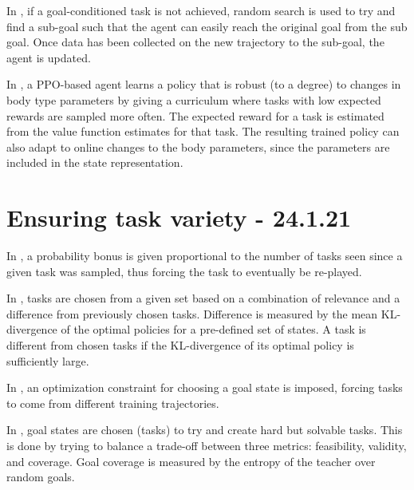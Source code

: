 \documentclass[letterpaper]{article}
\theoremstyle{definition}
\begin{document}
In \cite{Li}, if a goal-conditioned task is not achieved, random search is used to try and find a sub-goal such that the agent can easily reach the original goal from the sub goal. Once data has been collected on the new trajectory to the sub-goal, the agent is updated.

In \cite{Won2019}, a PPO-based agent learns a policy that is robust (to a degree) to changes in body type parameters by giving a curriculum where tasks with low expected rewards are sampled more often. 
The expected reward for a task is estimated from the value function estimates for that task. The resulting trained policy can also adapt to online changes to the body parameters, since the parameters are included in the state representation.

\section{Ensuring task variety - 24.1.21} \label{sec:variety}

In \cite{Jiang2020}, a probability bonus is given proportional to the number of tasks seen since a given task was sampled, thus forcing the task to eventually be re-played.

In \cite{Gutierrez2020}, tasks are chosen from a given set based on a combination of relevance and a difference from previously chosen tasks. Difference is measured by the mean KL-divergence of the optimal policies for a pre-defined set of states. A task is different from chosen tasks if the KL-divergence of its optimal policy is sufficiently large.

In \cite{Reny2019}, an optimization constraint for choosing a goal state is imposed, forcing tasks to come from different training trajectories.

In \cite{Racaniere2019}, goal states are chosen (tasks) to try and create hard but solvable tasks. 
This is done by trying to balance a trade-off between three metrics: feasibility, validity, and coverage.
Goal coverage is measured by the entropy of the teacher over random goals.
\end{document}
